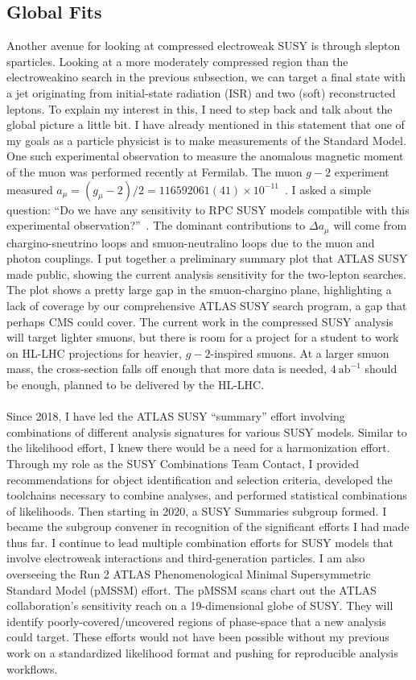 \documentclass[10pt,a4paper,sans]{moderncv} %
\begin{document}
\subsection{Global Fits}
Another avenue for looking at compressed electroweak SUSY is through slepton sparticles. Looking at a more moderately compressed region than the electroweakino search in the previous subsection, we can target a final state with a jet originating from initial-state radiation (ISR) and two (soft) reconstructed leptons. To explain my interest in this, I need to step back and talk about the global picture a little bit. I have already mentioned in this statement that one of my goals as a particle physicist is to make measurements of the Standard Model. One such experimental observation to measure the anomalous magnetic moment of the muon was performed recently at Fermilab. The muon $g-2$ experiment measured $a_\mu = (g_\mu-2)/2 = 116 592 061 (41) \times 10^{-11}$~\cite{PhysRevLett.126.141801}. I asked a simple question: ``Do we have any sensitivity to RPC SUSY models compatible with this experimental observation?''~\cite{Chakraborti:2021dli}. The dominant contributions to $\Delta a_\mu$ will come from chargino-sneutrino loops and smuon-neutralino loops due to the muon and photon couplings. I put together a preliminary summary plot that ATLAS SUSY made public, showing the current analysis sensitivity for the two-lepton searches. The plot shows a pretty large gap in the smuon-chargino plane, highlighting a lack of coverage by our comprehensive ATLAS SUSY search program, a gap that perhaps CMS could cover. The current work in the compressed SUSY analysis will target lighter smuons, but there is room for a project for a student to work on HL-LHC projections for heavier, $g-2$-inspired smuons. At a larger smuon mass, the cross-section falls off enough that more data is needed, $4\ \mathrm{ab}^{-1}$ should be enough, planned to be delivered by the HL-LHC.
\\
\\
Since 2018, I have led the ATLAS SUSY ``summary'' effort involving combinations of different analysis signatures for various SUSY models. Similar to the likelihood effort, I knew there would be a need for a harmonization effort. Through my role as the SUSY Combinations Team Contact, I provided recommendations for object identification and selection criteria, developed the toolchains necessary to combine analyses, and performed statistical combinations of likelihoods. Then starting in 2020, a SUSY Summaries subgroup formed. I became the subgroup convener in recognition of the significant efforts I had made thus far. I continue to lead multiple combination efforts for SUSY models that involve electroweak interactions and third-generation particles. I am also overseeing the Run 2 ATLAS Phenomenological Minimal Supersymmetric Standard Model (pMSSM) effort. The pMSSM scans chart out the ATLAS collaboration's sensitivity reach on a 19-dimensional globe of SUSY. They will identify poorly-covered/uncovered regions of phase-space that a new analysis could target. These efforts would not have been possible without my previous work on a standardized likelihood format and pushing for reproducible analysis workflows.
\end{document}
